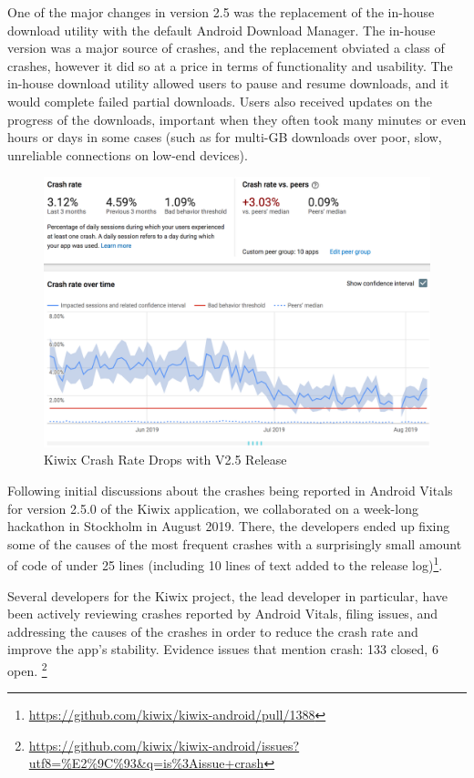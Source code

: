 One of the major changes in version 2.5 was the replacement of the in-house download utility with the default Android Download Manager\cite{kiwix_release_2_5_0}. The in-house version was a major source of crashes, and the replacement obviated a class of crashes, however it did so at a price in terms of functionality and usability. The in-house download utility allowed users to pause and resume downloads, and it would complete failed partial downloads. Users also received updates on the progress of the downloads, important when they often took many minutes or even hours or days in some cases (such as for multi-GB downloads over poor, slow, unreliable connections on low-end devices).

\begin{figure}[htbp!]
    \centering
    \includegraphics[width=\textwidth]{images/android-vitals-screenshots/kiwix-crash-rate-drops-with-v2_5.png}
    \caption{Kiwix Crash Rate Drops with V2.5 Release}
    \label{fig:kiwix_crash_rate_drops_v2_5}
\end{figure}

Following initial discussions about the crashes being reported in Android Vitals for version 2.5.0 of the Kiwix application, we collaborated on a week-long hackathon in Stockholm in August 2019. There, the developers ended up fixing some of the causes of the most frequent crashes with a surprisingly small amount of code of under 25 lines (including 10 lines of text added to the release log)\footnote{\url{https://github.com/kiwix/kiwix-android/pull/1388}}.

Several developers for the Kiwix project, the lead developer in particular, have been actively reviewing crashes reported by Android Vitals, filing issues, and addressing the causes of the crashes in order to reduce the crash rate and improve the app's stability. Evidence issues that mention crash: 133 closed, 6 open. \footnote{\url{https://github.com/kiwix/kiwix-android/issues?utf8=\%E2\%9C\%93&q=is\%3Aissue+crash}}

